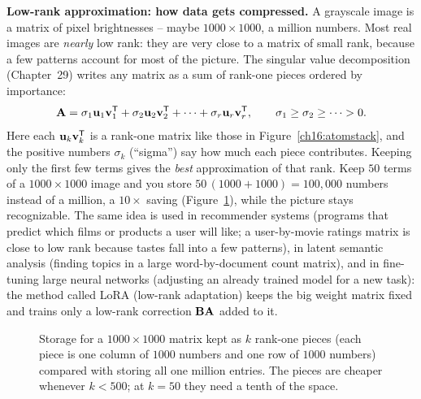 \begin{applicationbox}
\textbf{Low-rank approximation: how data gets compressed.} A grayscale image is a
matrix of pixel brightnesses -- maybe $1000\times 1000$, a million numbers. Most
real images are \emph{nearly} low rank: they are very close to a matrix of small
rank, because a few patterns account for most of the picture. The singular value
decomposition (Chapter~29) writes any matrix as a sum of rank-one pieces ordered
by importance:
\[
  \mathbf{A} = \sigma_1 \mathbf{u}_1\mathbf{v}_1^{\mathsf{T}} + \sigma_2 \mathbf{u}_2\mathbf{v}_2^{\mathsf{T}}
          + \cdots + \sigma_r \mathbf{u}_r\mathbf{v}_r^{\mathsf{T}},
  \qquad \sigma_1 \ge \sigma_2 \ge \cdots > 0.
\]
Here each $\mathbf{u}_k\mathbf{v}_k^{\mathsf{T}}$ is a rank-one matrix like those in
Figure~\ref{ch16:atomstack}, and the positive numbers $\sigma_k$ (``sigma'') say
how much each piece contributes. Keeping only the first few terms gives the
\emph{best} approximation of that rank. Keep $50$ terms of a $1000\times 1000$
image and you store $50\,(1000+1000)=100{,}000$ numbers instead of a million, a
$10\times$ saving (Figure~\ref{ch16:storage}), while the picture stays
recognizable. The same idea is used in recommender systems (programs that
predict which films or products a user will like; a user-by-movie ratings matrix
is close to low rank because tastes fall into a few patterns), in latent semantic
analysis (finding topics in a large word-by-document count matrix), and in
fine-tuning large neural networks (adjusting an already trained model for a new
task): the method called LoRA (low-rank adaptation) keeps the big weight matrix
fixed and trains only a low-rank correction $\mathbf{B}\mathbf{A}$ added to it.
\end{applicationbox}

\begin{figure}[htbp]
\centering
{}
\caption{Storage for a $1000\times 1000$ matrix kept as $k$ rank-one pieces
(each piece is one column of $1000$ numbers and one row of $1000$ numbers)
compared with storing all one million entries. The pieces are cheaper whenever
$k < 500$; at $k = 50$ they need a tenth of the space.}
\label{ch16:storage}
\end{figure}

